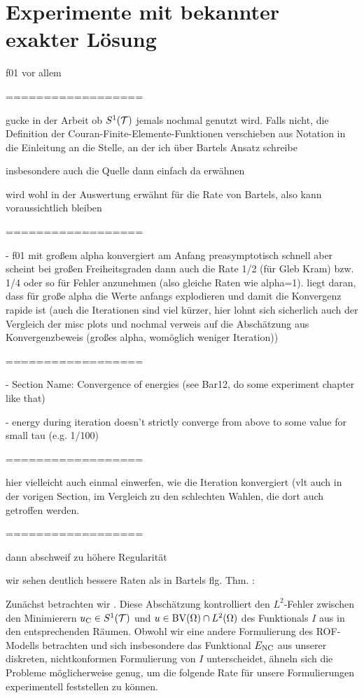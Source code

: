 \section{Experimente mit bekannter exakter Lösung}
\label{sec:experimentsWithExactSolution}

f01 vor allem

==================

gucke in der Arbeit ob $S^1(\mathcal{T})$ jemals nochmal genutzt wird. Falls nicht,
die Definition der Couran-Finite-Elemente-Funktionen verschieben aus Notation
in die Einleitung an die Stelle, an der ich über Bartels Ansatz schreibe

insbesondere auch die Quelle dann einfach da erwähnen

wird wohl in der Auswertung erwähnt für die Rate von Bartels, also kann 
voraussichtlich bleiben

==================

  - f01 mit großem alpha konvergiert am Anfang preasymptotisch schnell aber
    scheint bei großen Freiheitsgraden dann auch die Rate 1/2 (für Gleb Kram)
    bzw. 1/4 oder so für Fehler anzunehmen (also gleiche Raten wie alpha=1).
    liegt daran, dass für große alpha die Werte anfangs explodieren und damit
    die Konvergenz rapide ist (auch die Iterationen sind viel kürzer, hier
    lohnt sich sicherlich auch der Vergleich der misc plots und nochmal verweis
    auf die Abschätzung aus Konvergenzbeweis (großes alpha, womöglich weniger
    Iteration))

==================

  - Section Name: Convergence of energies (see Bar12, do some experiment
    chapter like that)

  - energy during iteration doesn't strictly converge from above to some value
    for small tau (e.g. 1/100)

==================

hier vielleicht auch einmal einwerfen, wie die Iteration konvergiert
(vlt auch in der vorigen Section, im Vergleich zu den schlechten Wahlen,
die dort auch getroffen werden.

==================

dann abschweif zu höhere Regularität

  wir sehen deutlich bessere Raten als in Bartels flg. Thm. :

  Zunächst betrachten wir \cite[S. 309, Theorem 10.7]{Bar15}. Diese
  Abschätzung kontrolliert den
  $L^2$-Fehler zwischen den Minimierern $u_{\textup{C}}\in S^1(\mathcal{T})$ und
  $u\in\textup{BV}(\Omega)\cap L^2(\Omega)$ des Funktionals $I$ aus  in
  den entsprechenden Räumen. Obwohl wir eine andere Formulierung des ROF-Modells 
  betrachten und sich insbesondere das Funktional $E_\textup{NC}$ aus unserer diskreten,
  nichtkonformen Formulierung von $I$ unterscheidet, ähneln sich die 
  Probleme möglicherweise genug, um die folgende Rate für unsere Formulierungen
  experimentell feststellen zu können.
  
